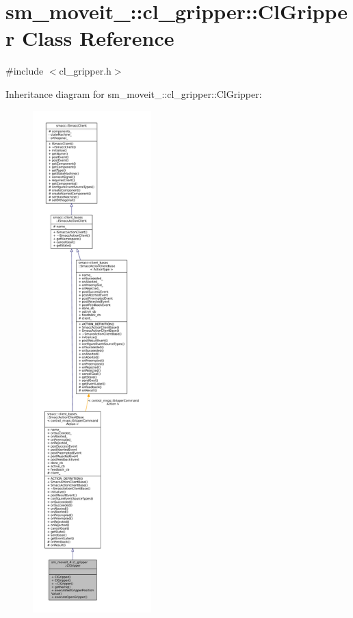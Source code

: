 \hypertarget{classsm__moveit__4_1_1cl__gripper_1_1ClGripper}{}\section{sm\+\_\+moveit\+\_\+:\+:cl\+\_\+gripper\+:\+:Cl\+Gripper Class Reference}
\label{classsm__moveit__4_1_1cl__gripper_1_1ClGripper}


{\ttfamily \#include $<$cl\+\_\+gripper.\+h$>$}



Inheritance diagram for sm\+\_\+moveit\+\_\+:\+:cl\+\_\+gripper\+:\+:Cl\+Gripper\+:
\nopagebreak
\begin{figure}[H]
\begin{center}
\leavevmode
\includegraphics[height=550pt]{classsm__moveit__4_1_1cl__gripper_1_1ClGripper__inherit__graph}
\end{center}
\end{figure}


